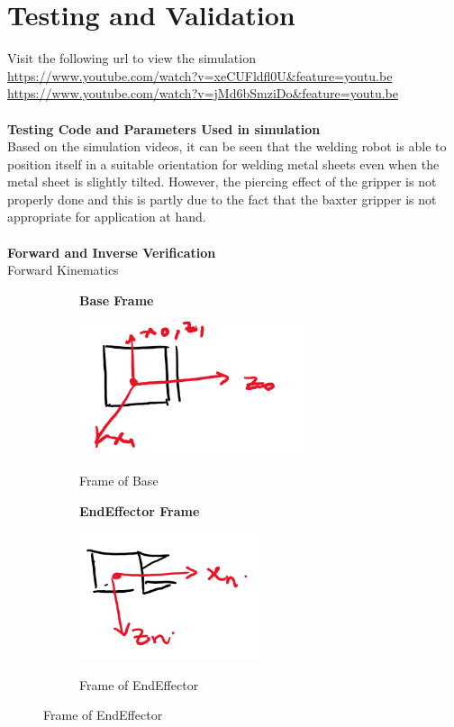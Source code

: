 \documentclass[12pt]{article}
\begin{document}
\section{Testing and Validation}
  Visit the following url to view the simulation \\
  \url{https://www.youtube.com/watch?v=xeCUFldfl0U&feature=youtu.be} \\
  \url{https://www.youtube.com/watch?v=jMd6bSmziDo&feature=youtu.be} \\ \\
  \textbf{Testing Code and Parameters Used in simulation} \\
  Based on the simulation videos, it can be seen that the welding robot is able to position itself
  in a suitable orientation for welding metal sheets even when the metal sheet is slightly tilted.
  However, the piercing effect of the gripper is not properly done and this is partly due to the fact that the
  baxter gripper is not appropriate for application at hand. \\ \\
  
  \textbf{Forward and Inverse Verification} \\
Forward Kinematics
\begin{figure}[H]
  \begin{subfigure}{.5\textwidth}
    \centering
    \textbf{Base Frame}\par\medskip
    \includegraphics[scale = 0.5]{baseframe.png}\\[0.0 cm]	%
    \caption{Frame of Base}
  \end{subfigure}
\begin{subfigure}{.5\textwidth}
    \centering
    \textbf{EndEffector Frame}\par\medskip
    \includegraphics[scale = 0.5]{endeffecotrframe.png}\\[0.0 cm]	%
    \caption{Frame of EndEffector}
\end{subfigure}
\end{figure}
\end{document}
